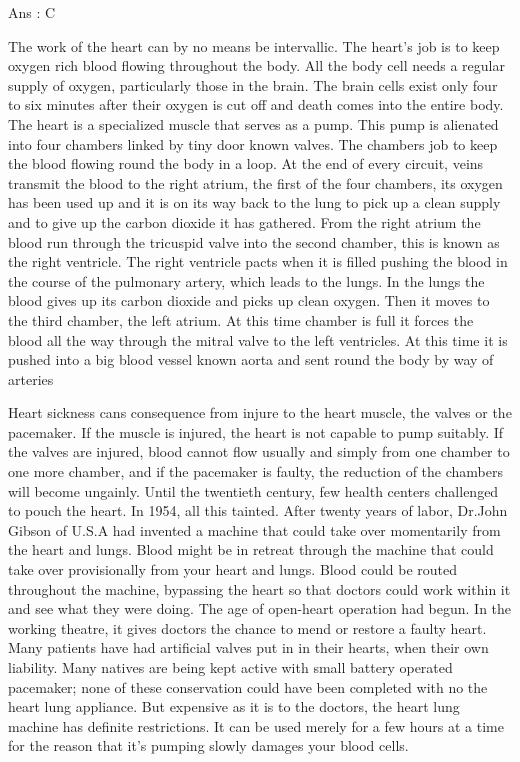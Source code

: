     Ans : C 


The work of the heart can by no means be intervallic. The heart’s job is to keep oxygen rich blood flowing throughout the body. All the body cell needs a regular supply of oxygen, particularly those in the brain. The brain cells exist only four to six minutes after their oxygen is cut off and death comes into the entire body. The heart is a specialized muscle that serves as a pump. This pump is alienated into four chambers linked by tiny door known valves. The chambers job to keep the blood flowing round the body in a loop. At the end of every circuit, veins transmit the blood to the right atrium, the first of the four chambers, its oxygen has been used up and it is on its way back to the lung to pick up a clean supply and to give up the carbon dioxide it has gathered. From the right atrium the blood run through the tricuspid valve into the second chamber, this is known as the right ventricle. The right ventricle pacts when it is filled pushing the blood in the course of the pulmonary artery, which leads to the lungs. In the lungs the blood gives up its carbon dioxide and picks up clean oxygen. Then it moves to the third chamber, the left atrium. At this time chamber is full it forces the blood all the way through the mitral valve to the left ventricles. At this time it is pushed into a big blood vessel known aorta and sent round the body by way of arteries

Heart sickness cans consequence from injure to the heart muscle, the valves or the pacemaker. If the muscle is injured, the heart is not capable to pump suitably. If the valves are injured, blood cannot flow usually and simply from one chamber to one more chamber, and if the pacemaker is faulty, the reduction of the chambers will become ungainly. Until the twentieth century, few health centers challenged to pouch the heart. In 1954, all this tainted. After twenty years of labor, Dr.John Gibson of U.S.A had invented a machine that could take over momentarily from the heart and lungs. Blood might be in retreat through the machine that could take over provisionally from your heart and lungs. Blood could be routed throughout the machine, bypassing the heart so that doctors could work within it and see what they were doing. The age of open-heart operation had begun. In the working theatre, it gives doctors the chance to mend or restore a faulty heart. Many patients have had artificial valves put in in their hearts, when their own liability. Many natives are being kept active with small battery operated pacemaker; none of these conservation could have been completed with no the heart lung appliance. But expensive as it is to the doctors, the heart lung machine has definite restrictions. It can be used merely for a few hours at a time for the reason that it’s pumping slowly damages your blood cells.

